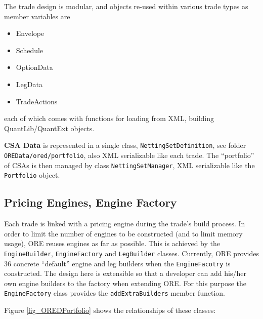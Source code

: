 \documentclass[12pt, a4paper]{article}
\begin{document}
The trade design is modular, and objects re-used within various trade types as member variables are
\begin{itemize}
\item Envelope
\item Schedule
\item OptionData
\item LegData
\item TradeActions
\end{itemize}
each of which comes with functions for loading from XML, building QuantLib/QuantExt objects.

{\bf CSA Data} is represented in a single class, {\tt NettingSetDefinition}, see folder {\tt OREData/ored/portfolio}, also XML serializable like each trade. The ``portfolio'' of CSAs is then managed by class {\tt NettingSetManager}, 
XML serializable like the {\tt Portfolio} object.

\subsection{Pricing Engines, Engine Factory}
Each trade is linked with a pricing engine during the trade's build process. In order to limit the number of engines to be constructed (and to limit memory usage), ORE reuses engines as far as possible. This is achieved by the {\tt EngineBuilder},
{\tt EngineFactory} and {\tt LegBuilder} classes. Currently, ORE provides 36 concrete ``default'' engine and leg builders when the {\tt EngineFacotry} is constructed. The design here is extensible so that a developer can add his/her own engine builders to the
factory when extending ORE. For this purpose the {\tt EngineFactory} class provides the {\tt addExtraBuilders} member function.

Figure \ref{fig_OREDPortfolio} shows the relationships of these classes:
\end{document}
